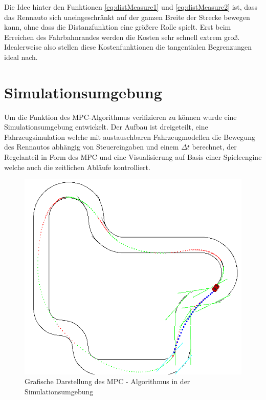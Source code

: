 \documentclass{like}
\begin{document}
Die Idee hinter den Funktionen \ref{eq:distMeasure1} und \ref{eq:distMeasure2} ist, dass das Rennauto sich uneingeschränkt auf der ganzen Breite der Strecke bewegen kann, ohne dass die Distanzfunktion eine größere Rolle spielt. Erst beim Erreichen des Fahrbahnrandes werden die Kosten sehr schnell extrem groß. Idealerweise also stellen diese Kostenfunktionen die tangentialen Begrenzungen ideal nach. 



\chapter{Simulationsumgebung}
Um die Funktion des \ac{MPC}-Algorithmus verifizieren zu können wurde eine Simulationsumgebung entwickelt. Der Aufbau ist dreigeteilt, eine Fahrzeugsimulation welche mit austauschbaren Fahrzeugmodellen die Bewegung des Rennautos abhängig von Steuereingaben und einem $\Delta t$ berechnet, der Regelanteil in Form des \ac{MPC} und eine Visualisierung auf Basis einer Spieleengine welche auch die zeitlichen Abläufe kontrolliert. 


\begin{figure}[ht!]
	\centering
	\includegraphics[width=350pt]{Abbildungen/sim_visual.png}
	\caption{Grafische Darstellung des MPC - Algorithmus in der Simulationsumgebung}
	\label{fig:jumpDiagram}
\end{figure}
\end{document}

